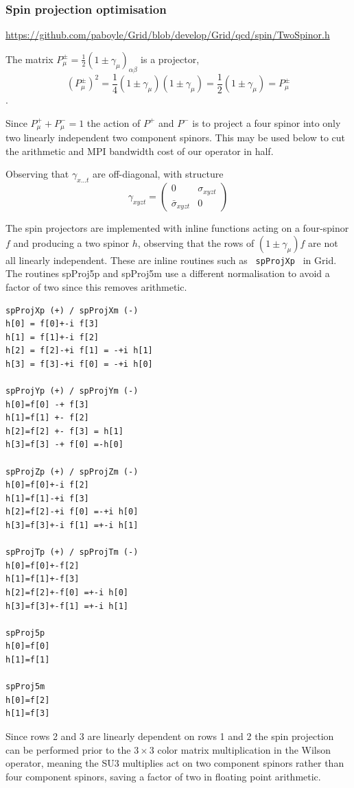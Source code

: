 \documentclass[letter,10pt]{report}
\begin{document}
\subsubsection{Spin projection optimisation}

\href{https://github.com/paboyle/Grid/blob/develop/Grid/qcd/spin/TwoSpinor.h}{https://github.com/paboyle/Grid/blob/develop/Grid/qcd/spin/TwoSpinor.h}

The matrix $P^\pm_\mu = \frac{1}{2} (1\pm\gamma_\mu)_{\alpha\beta}$ is a projector,
$$(P^\pm_\mu)^2 =  \frac{1}{4} (1\pm\gamma_\mu)(1\pm\gamma_\mu) =
\frac{1}{2} (1\pm\gamma_\mu) = P^\pm_\mu$$.

Since $P^+_\mu + P^-_\mu = 1$ the action of $P^+$ and $P^-$ is to project a four spinor into
only two linearly independent two component spinors. This may be used below to cut the
arithmetic and MPI bandwidth cost of our operator in half.

Observing that $\gamma_{x\ldots t}$ are off-diagonal, with structure
$$
\gamma_{xyzt}= \left(\begin{array}{cc}    0& \sigma_{xyzt} \\  \bar{\sigma}_{xyzt} &0 \end{array}\right)
$$

The spin projectors are implemented with inline functions acting on a four-spinor $f$ and producing a two
spinor $h$, observing that the rows of $(1\pm\gamma_\mu) f$ are not all linearly independent.
These are inline routines such as \verb| spProjXp | in Grid.
The routines spProj5p and spProj5m use a different normalisation to avoid a factor of two since this
removes arithmetic.
\begin{verbatim}
spProjXp (+) / spProjXm (-)
h[0] = f[0]+-i f[3]
h[1] = f[1]+-i f[2]
h[2] = f[2]-+i f[1] = -+i h[1]
h[3] = f[3]-+i f[0] = -+i h[0]

spProjYp (+) / spProjYm (-)
h[0]=f[0] -+ f[3]
h[1]=f[1] +- f[2]
h[2]=f[2] +- f[3] = h[1]
h[3]=f[3] -+ f[0] =-h[0]

spProjZp (+) / spProjZm (-)
h[0]=f[0]+-i f[2]
h[1]=f[1]-+i f[3]
h[2]=f[2]-+i f[0] =-+i h[0]
h[3]=f[3]+-i f[1] =+-i h[1]

spProjTp (+) / spProjTm (-)
h[0]=f[0]+-f[2]
h[1]=f[1]+-f[3]
h[2]=f[2]+-f[0] =+-i h[0]
h[3]=f[3]+-f[1] =+-i h[1]

spProj5p
h[0]=f[0]
h[1]=f[1]

spProj5m
h[0]=f[2]
h[1]=f[3]
\end{verbatim}

Since rows 2 and 3 are linearly dependent on rows 1 and 2 the spin projection can be performed prior to the
$3\times 3$ color matrix multiplication in the Wilson operator, meaning the SU3 multiplies act on two component
spinors rather than four component spinors, saving a factor of two in floating point arithmetic.
\end{document}
